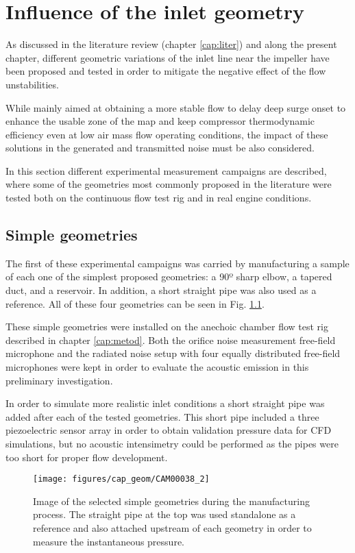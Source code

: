 \chapter{Influence of the inlet geometry} 
\label{cap:geom}

As discussed in the literature review (chapter \ref{cap:liter}) and along the present chapter, different geometric variations of the inlet line near the impeller have been proposed and tested in order to mitigate the negative effect of the flow unstabilities.

While mainly aimed at obtaining a more stable flow to delay deep surge onset to enhance the usable zone of the map and keep compressor thermodynamic efficiency even at low air mass flow operating conditions, the impact of these solutions in the generated and transmitted noise must be also considered.

In this section different experimental measurement campaigns are described, where some of the geometries most commonly proposed in the literature were tested both on the continuous flow test rig and in real engine conditions. 

\section{Simple geometries}

The first of these experimental campaigns was carried by manufacturing a sample of each one of the simplest proposed geometries: a 90º sharp elbow, a tapered duct, and a reservoir. In addition, a short straight pipe was also used as a reference. All of these four geometries can be seen in Fig. \ref{fig:image_simple_geom}.

These simple geometries were installed on the anechoic chamber flow test rig described in chapter \ref{cap:metod}. Both the orifice noise measurement free-field microphone and the radiated noise setup with four equally distributed free-field microphones were kept in order to evaluate the acoustic emission in this preliminary investigation.

In order to simulate more realistic inlet conditions a short straight pipe was added after each of the tested geometries. This short pipe included a three piezoelectric sensor array in order to obtain  validation pressure data for CFD simulations, but no acoustic intensimetry could be performed as the pipes were too short for proper flow development.

\begin{figure}[tb!]
\centering
\texttt{[image: figures/cap\_geom/CAM00038\_2]}
\caption{Image of the selected simple geometries during the manufacturing process. The straight pipe at the top was used standalone as a reference and also attached upstream of each geometry in order to measure the instantaneous pressure.}
\label{fig:image_simple_geom}
\end{figure}

